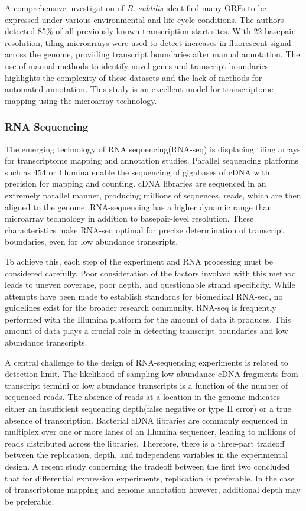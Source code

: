 A comprehensive investigation of \textit{B. subtilis} identified many ORFs to be expressed under various environmental and life-cycle conditions.\cite{162} The authors detected 85\% of all previously known transcription start sites.\cite{162} With 22-basepair resolution, tiling microarrays were used to detect increases in fluorescent signal across the genome, providing transcript boundaries after manual annotation. The use of manual methods to identify novel genes and transcript boundaries highlights the complexity of these datasets and the lack of methods for automated annotation. This study\cite{162} is an excellent model for transcriptome mapping using the microarray technology.

\subsubsection{RNA Sequencing}
The emerging technology of RNA sequencing(RNA-seq) is displacing tiling arrays for transcriptome mapping and annotation studies.\cite{163} Parallel sequencing platforms such as 454\cite{166} or Illumina\cite{167} enable the sequencing of gigabases of cDNA with precision for mapping and counting. cDNA libraries are sequenced in an extremely parallel manner, producing millions of sequences, reads, which are then aligned to the genome. RNA-sequencing has a higher dynamic range than microarray technology in addition to basepair-level resolution.\cite{163} These characteristics make RNA-seq optimal for precise determination of transcript boundaries, even for low abundance transcripts.

To achieve this, each step of the experiment and RNA processing must be considered carefully. Poor consideration of the factors involved with this method leads to uneven coverage,\cite{108,109,110,111,115} poor depth,\cite{114,115} and questionable strand specificity.\cite{113} While attempts have been made to establish standards for biomedical RNA-seq,\cite{110} no guidelines exist for the broader research community. RNA-seq is frequently performed with the Illumina platform for the amount of data it produces. This amount of data plays a crucial role in detecting transcript boundaries and low abundance transcripts.

A central challenge to the design of RNA-sequencing experiments is related to detection limit. The likelihood of sampling low-abundance cDNA fragments from transcript termini or low abundance transcripts is a function of the number of sequenced reads.\cite{108,109,110,112} The absence of reads at a location in the genome indicates either an insufficient sequencing depth(false negative or type II error) or a true absence of transcription. Bacterial cDNA libraries are commonly sequenced in multiplex over one or more lanes of an Illumina sequencer, leading to millions of reads distributed across the libraries. Therefore, there is a three-part tradeoff between the replication, depth, and independent variables in the experimental design. A recent study concerning the tradeoff between the first two concluded that for differential expression experiments, replication is preferable.\cite{112} In the case of transcriptome mapping and genome annotation however, additional depth may be preferable.\cite{110}

